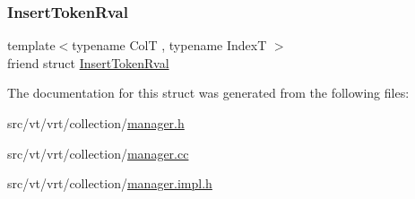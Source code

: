 \mbox{\label{structvt_1_1vrt_1_1collection_1_1_collection_manager_a43891fd66d429b4c9d8d01249f923b0b}} 
\subsubsection{\texorpdfstring{Insert\+Token\+Rval}{InsertTokenRval}}
{\footnotesize\ttfamily template$<$typename ColT , typename IndexT $>$ \\
friend struct \hyperlink{structvt_1_1vrt_1_1collection_1_1_insert_token_rval}{Insert\+Token\+Rval}\hspace{0.3cm}{\ttfamily [friend]}}



The documentation for this struct was generated from the following files\+:\begin{DoxyCompactItemize}
\item 
src/vt/vrt/collection/\hyperlink{vrt_2collection_2manager_8h}{manager.\+h}\item 
src/vt/vrt/collection/\hyperlink{vrt_2collection_2manager_8cc}{manager.\+cc}\item 
src/vt/vrt/collection/\hyperlink{vrt_2collection_2manager_8impl_8h}{manager.\+impl.\+h}\end{DoxyCompactItemize}
